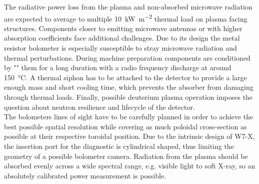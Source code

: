             The radiative power loss from the plasma and non-absorbed microwave radiation are expected to average to multiple \SI{10}{\kilo\watt\per\square\meter} thermal load on plasma facing structures. Components closer to emitting microwave antennas or with higher absorption coefficients face additional challenges\cite{Koenig2010,Burhenn2011}. Due to its design the metal resistor bolometer is especially susceptible to stray microwave radiation and thermal perturbations. During machine preparation components are conditioned by "" them for a long duration with a radio frequency discharge at around \SI{150}{\celsius}. A thermal siphon has to be attached to the detector to provide a large enough mass and short cooling time, which prevents the absorber from damaging through thermal loads. Finally, possible deuterium plasma operation imposes the question about neutron resilience and lifecycle of the detector.\\%
            The bolometers lines of sight have to be carefully planned in order to achieve the best possible spatial resolution while covering as much poloidal cross-section as possible at their respective toroidal position. Due to the intrinsic design of W7-X, the insertion port for the diagnostic is cylindrical shaped, thus limiting the geometry of a possible bolometer camera. Radiation from the plasma should be absorbed evenly across a wide spectral range, e.g. visible light to soft X-ray, so an absolutely calibrated power measurement is possible.%
%
